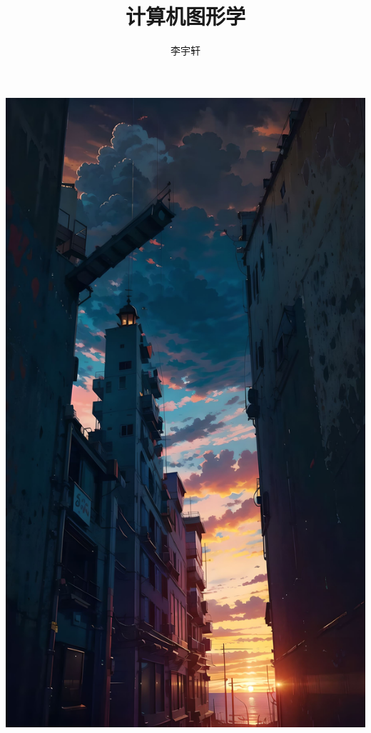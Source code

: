 \documentclass{notebook-neon}
\title{计算机图形学}
\author{李宇轩}
\begin{document}
\maketitle

\frontmatter

\makesymb

\begin{center}
    \includegraphics[width=13.5cm]{017.jpeg}
\end{center}

\clearpage
\end{document}
